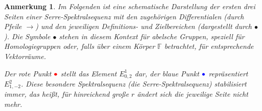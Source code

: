\documentclass[12pt, hidelinks]{article}
\numberwithin{conj}{section}
\newtheorem{remark}[conj]{Anmerkung}
\begin{document}
\begin{remark}
    Im Folgenden ist eine schematische Darstellung der ersten drei Seiten einer Serre-Spektralsequenz mit den zugehörigen Differentialen (durch Pfeile $\rightarrow$) und den jeweiligen Definitions- und Zielbereichen (dargestellt durch $\bullet$). Die Symbole $\bullet$ stehen in diesem Kontext für abelsche Gruppen, speziell für Homologiegruppen oder, falls über einem Körper $\mathbb{F}$ betrachtet, für entsprechende Vektorräume. 
    
    Der rote Punkt $\color{red}\bullet$ stellt das Element $E^1_{0,2}$ dar, der blaue Punkt $\color{blue}\bullet$ repräsentiert $E^2_{1,-2}$. Diese besondere Spektralsequenz (die Serre-Spektralsequenz) \emph{stabilisiert} immer, das heißt, für hinreichend große $r$ ändert sich die jeweilige Seite nicht mehr.
    

\end{remark}
\end{document}
